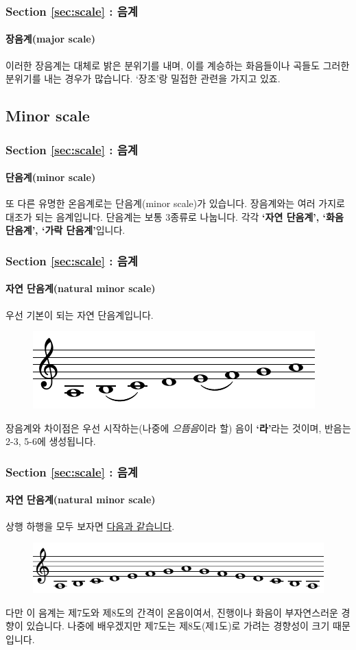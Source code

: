 \documentclass{beamer}
\begin{document}
	\begin{frame}
		\frametitle{Section \ref{sec:scale} : 음계}
		\framesubtitle{장음계(major scale)}
		이러한 장음계는 대체로 밝은 분위기를 내며, 이를 계승하는 화음들이나 곡들도 그러한 분위기를 내는 경우가 많습니다. `장조'랑 밀접한 관련을 가지고 있죠.
	\end{frame}
	
	\subsection{Minor scale}
	\begin{frame}
		\frametitle{Section \ref{sec:scale} : 음계}
		\framesubtitle{단음계(minor scale)}
		또 다른 유명한 온음계로는 단음계(minor scale)가 있습니다. 장음계와는 여러 가지로 대조가 되는 음계입니다. 단음계는 보통 3종류로 나눕니다. 각각 {\bf `자연 단음계', `화음 단음계', `가락 단음계'}입니다.
	\end{frame}
	
	\begin{frame}
		\frametitle{Section \ref{sec:scale} : 음계}
		\framesubtitle{자연 단음계(natural minor scale)}
		우선 기본이 되는 자연 단음계입니다.
		\begin{figure}[!h]
			\centering
			{\includegraphics[width=\textwidth]{res/pdf/7/scale/natural_minor_ascend.pdf}}
		\end{figure}
		장음계와 차이점은 우선 시작하는(나중에 {\it 으뜸음}이라 할) 음이 {\bf `라'}라는 것이며, 반음는 2-3, 5-6에 생성됩니다.
	\end{frame}
	
	\begin{frame}
		\frametitle{Section \ref{sec:scale} : 음계}
		\framesubtitle{자연 단음계(natural minor scale)}
		상행 하행을 모두 보자면 {\color{cyan}\href{run:res/mp3/7/scale/natural_minor.mp3}{다음과 같습니다}}.
		\begin{figure}[!h]
			\centering
			{\includegraphics[width=\textwidth]{res/pdf/7/scale/natural_minor.pdf}}
		\end{figure}
		다만 이 음계는 제7도와 제8도의 간격이 온음이여서, 진행이나 화음이 부자연스러운 경향이 있습니다. 나중에 배우겠지만 제7도는 제8도(제1도)로 가려는 경향성이 크기 때문입니다.
	\end{frame}
	
\end{document}
